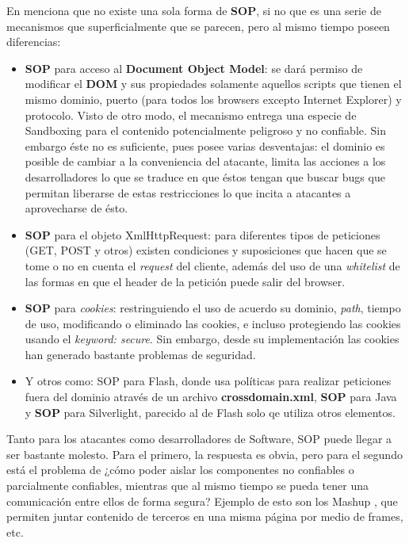     En \cite{Zalewsk08} menciona que no existe una sola forma de \textbf{SOP}, si no que es una serie de mecanismos que superficialmente que se parecen, pero al mismo tiempo poseen diferencias:

    \begin{itemize}
        \item \textbf{SOP} para acceso al \textbf{Document Object Model}: se dará permiso de modificar el \textbf{DOM} y sus propiedades solamente aquellos scripts que tienen el mismo dominio, puerto (para todos los browsers excepto Internet Explorer) y protocolo. Visto de otro modo, el mecanismo entrega una especie de Sandboxing para el contenido potencialmente peligroso y no confiable. Sin embargo éste no es suficiente, pues posee varias desventajas: el dominio es posible de cambiar a la conveniencia del atacante, limita las acciones a los desarrolladores lo que se traduce en que éstos tengan que buscar bugs que permitan liberarse de estas restricciones lo que incita a atacantes a aprovecharse de ésto.
        \item \textbf{SOP} para el objeto XmlHttpRequest: para diferentes tipos de peticiones (GET, POST y otros) existen condiciones y suposiciones que hacen que se tome o no en cuenta el \textit{request} del cliente, además del uso de una \textit{whitelist} de las formas en que el header de la petición puede salir del browser.
        \item \textbf{SOP} para \textit{cookies}: restringuiendo el uso de acuerdo su dominio, \textit{path}, tiempo de uso, modificando o eliminado las cookies, e incluso protegiendo las cookies usando el \textit{keyword: secure}. Sin embargo, desde su implementación las cookies han generado bastante problemas de seguridad.
        \item Y otros como: {SOP} para Flash, donde usa políticas para realizar peticiones fuera del dominio através de un archivo \textbf{crossdomain.xml}, \textbf{SOP} para Java y \textbf{SOP} para Silverlight, parecido al de Flash solo qe utiliza otros elementos.
    \end{itemize}

    
    Tanto para los atacantes como desarrolladores de Software, SOP puede llegar a ser bastante molesto. Para el primero, la respuesta es obvia, pero para el segundo está el problema de ¿cómo poder aislar los componentes no confiables o parcialmente confiables, mientras que al mismo tiempo se pueda tener una comunicación entre ellos de forma segura? Ejemplo de esto son los Mashup \cite{barth2009securing}, que permiten juntar contenido de terceros en una misma página por medio de frames, etc. 
        
